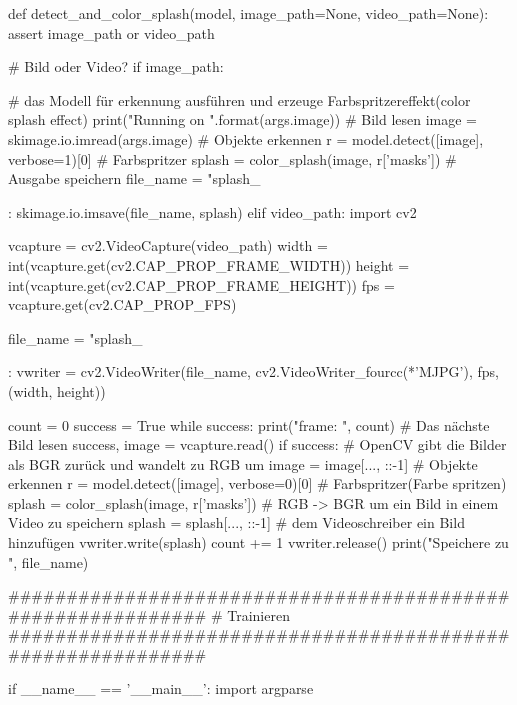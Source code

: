 def detect_and_color_splash(model, image_path=None, video_path=None):
    assert image_path or video_path

    # Bild oder Video?
    if image_path:
        
        # das Modell für erkennung ausführen und erzeuge Farbspritzereffekt(color splash effect)
        print("Running on {}".format(args.image))
        # Bild lesen
        image = skimage.io.imread(args.image)
        #  Objekte erkennen
        r = model.detect([image], verbose=1)[0]
        # Farbspritzer
        splash = color_splash(image, r['masks'])
        # Ausgabe speichern 
        file_name = "splash_{:%
        skimage.io.imsave(file_name, splash)
    elif video_path:
        import cv2
        
        vcapture = cv2.VideoCapture(video_path)
        width = int(vcapture.get(cv2.CAP_PROP_FRAME_WIDTH))
        height = int(vcapture.get(cv2.CAP_PROP_FRAME_HEIGHT))
        fps = vcapture.get(cv2.CAP_PROP_FPS)

        
        file_name = "splash_{:%
        vwriter = cv2.VideoWriter(file_name,
                                  cv2.VideoWriter_fourcc(*'MJPG'),
                                  fps, (width, height))

        count = 0
        success = True
        while success:
            print("frame: ", count)
            # Das nächste Bild lesen
            success, image = vcapture.read()
            if success:
                # OpenCV gibt die Bilder als BGR zurück und wandelt zu RGB um 
                image = image[..., ::-1]
                # Objekte erkennen
                r = model.detect([image], verbose=0)[0]
                # Farbspritzer(Farbe spritzen)
                splash = color_splash(image, r['masks'])
                # RGB -> BGR um ein Bild in einem Video zu speichern
                splash = splash[..., ::-1]
                # dem Videoschreiber ein Bild hinzufügen
                vwriter.write(splash)
                count += 1
        vwriter.release()
    print("Speichere zu ", file_name)


############################################################
#  Trainieren
############################################################

if __name__ == '__main__':
    import argparse

}}
